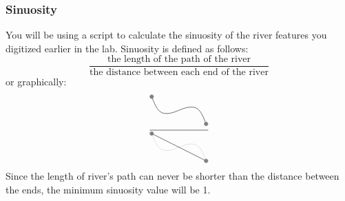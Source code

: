 \documentclass{article}
\begin{document}
\subsubsection{Sinuosity}
You will be using a script to calculate the sinuosity of the river features you digitized earlier in the lab.  Sinuosity is defined as follows: 
\begin{equation*}
    \frac{\text{the length of the path of the river}}{\text{the distance between each end of the river}}
\end{equation*}
or graphically:
\begin{equation*}
    \frac{
          \begin{tikzpicture}
              \draw (0,1) .. controls (.2, .5) and (.3, .2) .. (1, .5)
                          .. controls (1.7, .8) and (1.8, .5) .. (2, 0);
              \filldraw[gray] (0,1) circle [radius=2pt]
                              (2,0) circle [radius=2pt];
          \end{tikzpicture}
      }{
          \begin{tikzpicture}
             \draw[black!20] (0,1) .. controls (.2, .5) and (.3, .2) .. (1, .5)
                               .. controls (1.7, .8) and (1.8, .5) .. (2,0);
              \draw (0,1) -- (2,0);
              \filldraw[gray] (0,1) circle [radius=2pt]
                              (2,0) circle [radius=2pt];
          \end{tikzpicture}
       }
\end{equation*}
Since the length of river's path can never be shorter than the distance between the ends, the minimum sinuosity value will be 1.
\end{document}
